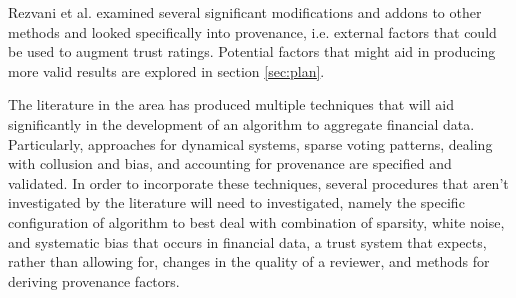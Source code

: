Rezvani et al. \cite{rezvani2018provenance} examined several significant modifications and addons to other methods and looked specifically into provenance, i.e. external factors that could be used to augment trust ratings. Potential factors that might aid in producing more valid results are explored in section \ref{sec:plan}.

The literature in the area has produced multiple techniques that will aid significantly in the development of an algorithm to aggregate financial data. Particularly, approaches for dynamical systems, sparse voting patterns, dealing with collusion and bias, and accounting for provenance are specified and validated. In order to incorporate these techniques, several procedures that aren't investigated by the literature will need to investigated, namely the specific configuration of algorithm to best deal with combination of sparsity, white noise, and systematic bias that occurs in financial data, a trust system that expects, rather than allowing for, changes in the quality of a reviewer, and methods for deriving provenance factors.